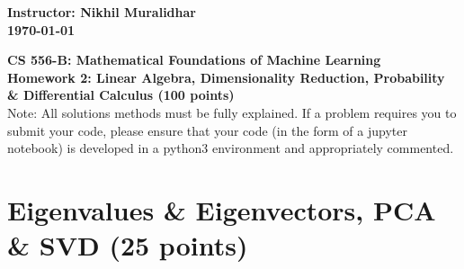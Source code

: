 \documentclass{article}%
\begin{document}
\begin{flushleft}
\textbf{Instructor: Nikhil Muralidhar \\
\today}
\end{flushleft}

\begin{center}
\textbf{\Large CS 556-B: Mathematical Foundations of Machine Learning \\
Homework 2: Linear Algebra, Dimensionality Reduction, Probability \& Differential Calculus (100 points)} \\
\vspace{2ex}
Note: All solutions methods must be fully explained. If a problem requires you to submit your code, please ensure that your code (in the form of a jupyter notebook) is developed in a python3 environment and appropriately commented.
\end{center}

\section*{Eigenvalues \& Eigenvectors, PCA \& SVD (25 points)}
\end{document}
